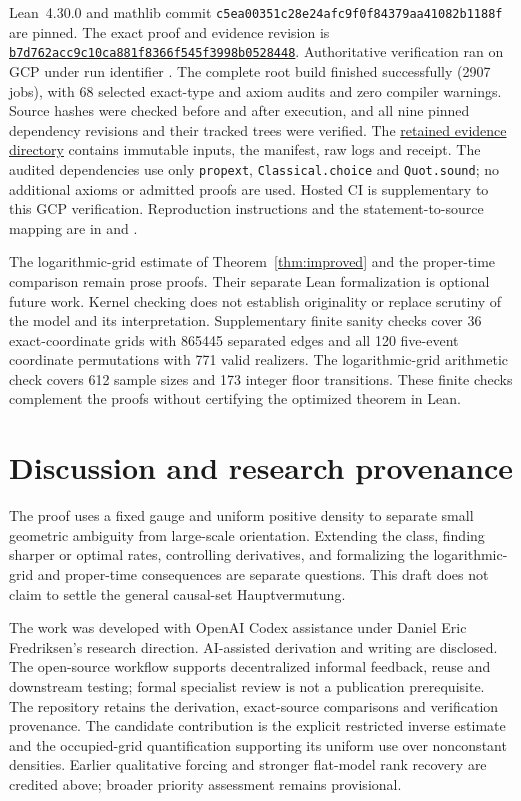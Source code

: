 \documentclass[11pt]{article}
\theoremstyle{remark}
\begin{document}
Lean~4.30.0 and mathlib commit
\texttt{c5ea00351c28e24afc9f0f84379aa41082b1188f} are pinned.
The exact proof and evidence revision is
\href{https://github.com/Quantyra/quantyra-null-cone-lean/tree/b7d762acc9c10ca881f8366f545f3998b0528448}{\texttt{b7d762acc9c10ca881f8366f545f3998b0528448}}.
Authoritative verification ran on GCP under run identifier
. The complete root build
finished successfully (2907 jobs), with 68 selected exact-type and
axiom audits and zero compiler warnings. Source hashes were checked
before and after execution, and all nine pinned dependency revisions
and their tracked trees were verified. The
\href{https://github.com/Quantyra/quantyra-null-cone-lean/tree/b7d762acc9c10ca881f8366f545f3998b0528448/evidence/gcp/space-unlabeled-20261007T123238Z-759aaa}{retained evidence directory}
contains immutable inputs, the manifest, raw logs and receipt.
The audited dependencies use only \texttt{propext},
\texttt{Classical.choice} and \texttt{Quot.sound}; no additional axioms
or admitted proofs are used. Hosted CI is supplementary to this GCP
verification. Reproduction instructions and the statement-to-source
mapping are in  and .

The logarithmic-grid estimate of Theorem~\ref{thm:improved} and the
proper-time comparison remain prose proofs. Their separate Lean
formalization is optional future work. Kernel checking does not establish
originality or replace scrutiny of the model and its interpretation.
Supplementary finite sanity checks cover 36 exact-coordinate grids
with 865445 separated edges and all 120 five-event coordinate permutations
with 771 valid realizers. The logarithmic-grid arithmetic check covers
612 sample sizes and 173 integer floor transitions. These finite checks
complement the proofs without certifying the optimized theorem in Lean.

\section{Discussion and research provenance}
The proof uses a fixed gauge and uniform positive density to separate
small geometric ambiguity from large-scale orientation. Extending
the class, finding sharper or optimal rates, controlling derivatives,
and formalizing the logarithmic-grid and proper-time consequences are
separate questions. This draft
does not claim to settle the general causal-set Hauptvermutung.

The work was developed with OpenAI Codex assistance under Daniel Eric
Fredriksen's research direction. AI-assisted derivation and writing are
disclosed. The open-source workflow supports decentralized informal
feedback, reuse and downstream testing; formal specialist review is
not a publication prerequisite. The repository retains the derivation, exact-source
comparisons and verification provenance. The candidate contribution
is the explicit restricted inverse estimate and the occupied-grid
quantification supporting its uniform use over nonconstant densities.
Earlier qualitative forcing and stronger flat-model rank recovery are
credited above; broader priority assessment remains provisional.
\end{document}
